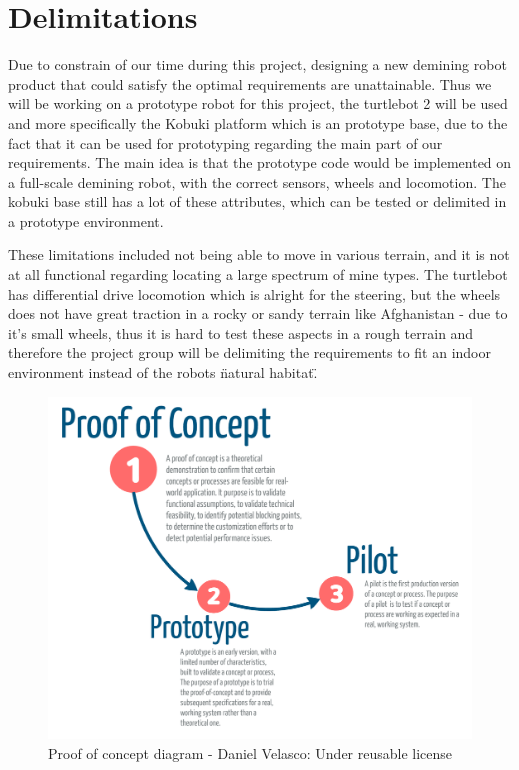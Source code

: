 \chapter{Delimitations}

Due to constrain of our time during this project, designing a new demining robot product that could satisfy the optimal requirements are unattainable. Thus we will be working on a prototype robot for this project, the turtlebot 2 will be used and more specifically the Kobuki platform which is an prototype base, due to the fact that it can be used for prototyping regarding the main part of our requirements. The main idea is that the prototype code would be implemented on a full-scale demining robot, with the correct sensors, wheels and locomotion. The kobuki base still has a lot of these attributes, which can be tested or delimited in a prototype environment. 

\vspace{2mm}

These limitations included not being able to move in various terrain, and it is not at all functional regarding locating a large spectrum of mine types. The turtlebot has differential drive locomotion which is alright for the steering, but the wheels does not have great traction in a rocky or sandy terrain like Afghanistan - due to it's small wheels, thus it is hard to test these aspects in a rough terrain and therefore the project group will be delimiting the requirements to fit an indoor environment instead of the robots \"natural habitat\".

\begin{figure}[h]
    \centering
        \includegraphics[width=12cm]{00 - Images/POC-reusable-license.PNG}
    \caption{Proof of concept diagram - Daniel Velasco: Under reusable license}
    \label{fig:POC}
  \end{figure}

